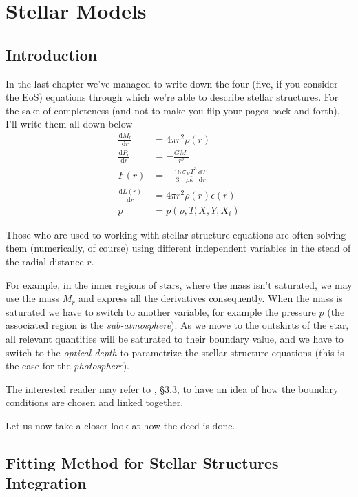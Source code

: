 \chapter{Stellar Models}\label{ch:iii}

\section{Introduction}

\par In the last chapter we've managed to write down the four (five, if you consider the EoS) equations through which we're able to describe stellar structures. For the sake of completeness (and not to make you flip your pages back and forth), I'll write them all down below
\begin{align*}
	\frac{\text{d}M_{r}}{\text{d}r} &= 4\pi r^{2}\rho(r)\\
	\frac{\text{d}P_{r}}{\text{d}r} &= -\frac{GM_{r}}{r^{2}} \\
	F(r) &= -\frac{16}{3}\frac{\sigma_{B}T^{3}}{\rho\bar{\kappa}}\frac{\text{d}T}{\text{d}r}\\
	\frac{\text{d}L(r)}{\text{d}r} &= 4\pi r^{2} \rho(r)\epsilon(r)\\
	p &= p(\rho, T, X, Y, X_{i})
\end{align*}
\par Those who are used to working with stellar structure equations are often solving them (numerically, of course) using different independent variables in the stead of the radial distance $r$.
\par For example, in the inner regions of stars, where the mass isn't saturated, we may use the mass $M_{r}$ and express all the derivatives consequently. When the mass is saturated we have to switch to another variable, for example the pressure $p$ (the associated region is the \emph{sub-atmosphere}). As we move to the outskirts of the star, all relevant quantities will be saturated to their boundary value, and we have to switch to the \emph{optical depth} to parametrize the stellar structure equations (this is the case for the \emph{photosphere}).
\par The interested reader may refer to \cite{choudhuri}, §3.3, to have an idea of how the boundary conditions are chosen and linked together.
\par Let us now take a closer look at how the deed is done.

\section{Fitting Method for Stellar Structures Integration}

